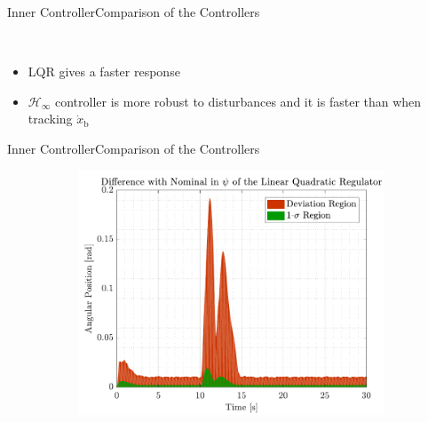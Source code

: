 \begin{frame}{Inner Controller}{Comparison of the Controllers}
\begin{figure}[H]
\begin{minipage}{0.45\linewidth}
\begin{figure}[H]
      \end{figure}                
    \end{minipage}\hfill \\
  \end{figure}
    \begin{itemize}
        \item LQR gives a faster response
        \item $\mathcal{H}_\infty$ controller is more robust to disturbances and it is faster than when tracking $\dot{x}_\mathrm{b}$
    \end{itemize}
\end{frame}

\begin{frame}{Inner Controller}{Comparison of the Controllers}
  \begin{figure}[H]
    \begin{minipage}{0.45\linewidth}
      \begin{figure}[H]
        \centering
        \includegraphics[width=1\linewidth]{figures/yaw_mc_lqr_error}
      \end{figure}        
    \end{minipage}\hfill      
    \begin{minipage}{0.45\linewidth}
      \begin{figure}[H]
        \centering

\end{figure}
\end{minipage}
\end{figure}
\end{frame}
